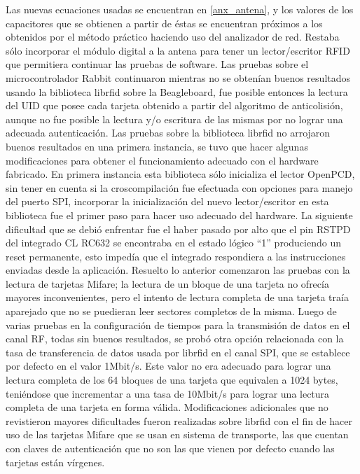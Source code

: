 Las nuevas ecuaciones usadas se encuentran en \ref{anx_antena}, y los valores de los capacitores que se obtienen a partir de éstas se encuentran próximos a los obtenidos por el método práctico haciendo uso del analizador de red.
Restaba sólo incorporar el módulo digital a la antena para tener un lector/escritor RFID que permitiera continuar las pruebas de software.
Las pruebas sobre el microcontrolador Rabbit continuaron mientras no se obtenían buenos resultados usando la biblioteca librfid sobre la Beagleboard, fue posible entonces la lectura del UID que posee cada tarjeta obtenido a partir del algoritmo de anticolisión, aunque no fue posible la lectura y/o escritura de las mismas por no lograr una adecuada autenticación.
Las pruebas sobre la biblioteca librfid no arrojaron buenos resultados en una primera instancia, se tuvo que hacer algunas modificaciones para obtener el funcionamiento adecuado con el hardware fabricado. En primera instancia esta biblioteca sólo inicializa el lector OpenPCD, sin tener en cuenta si la croscompilación fue efectuada con opciones para manejo del puerto SPI, incorporar la inicialización del nuevo lector/escritor en esta biblioteca fue el primer paso para hacer uso adecuado del hardware. 
La siguiente dificultad que se debió enfrentar fue el haber pasado por alto que el pin RSTPD del integrado CL RC632 se encontraba en el estado lógico “1” produciendo un reset permanente, esto impedía que el integrado respondiera a las instrucciones enviadas desde la aplicación.
Resuelto lo anterior comenzaron las pruebas con la lectura de tarjetas Mifare; la lectura de un bloque de una tarjeta no ofrecía mayores inconvenientes, pero el intento de lectura completa de una tarjeta traía aparejado que no se puedieran leer sectores completos de la misma. Luego de varias pruebas en la configuración de tiempos para la transmisión de datos en el canal RF, todas sin buenos resultados, se probó otra opción relacionada con la tasa de transferencia de datos usada por librfid en el canal SPI, que se establece por defecto en el valor 1Mbit/s. Este valor no era adecuado para lograr una lectura completa de los 64 bloques de una tarjeta que equivalen a 1024 bytes, teniéndose que incrementar a una tasa de 10Mbit/s para lograr una lectura completa de una tarjeta en forma válida.
Modificaciones adicionales que no revistieron mayores dificultades fueron realizadas sobre librfid con el fin de hacer uso de las tarjetas Mifare que se usan en sistema de transporte, las que cuentan con claves de autenticación que no son las que vienen por defecto cuando las tarjetas están vírgenes. 